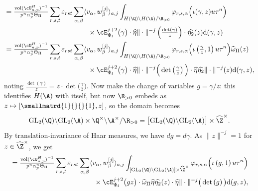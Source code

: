 \documentclass[10pt,reqno,a4paper]{amsart}
\newcommand{\Phif}{{\Phi\subf}}
\newcommand{\omegahat}{\widehat{\omega}}
\newcommand{\etahat}{\widehat{\eta}}
\newcommand{\subf}{_{\mathrm{f}}}
\newcommand{\GL}{\mathrm{GL}}
\begin{document}
\begin{align*}
&= \tfrac{\operatorname{vol}(\cU_{n,p}^H)^{-1}}{{p^{n}\alpha_{p}^n} \Theta_\Pi} \sum_{r,s,t} \varepsilon_{rst} \sum_{\alpha,\beta} \langle v_\alpha, w_\beta^{[j]}\rangle_{a,j}
\int_{H(\Q)\backslash H(\A)/\R_{>0}}  \varphi_{r,s,\alpha}\Big(\iota(\gamma,z)u\tau^{n}\Big)   \\
&\hspace{120pt}\times \cE_{\Phif}^{j+2} \big(\gamma \big) \cdot \etahat\|\cdot\|^{-j}\left(\tfrac{\det(\gamma)}{z}\right)\cdot \widehat{\eta_2}(z)  \mathrm{d}(\gamma,z)\\
&= \tfrac{\operatorname{vol}(\cU_{n,p}^H)^{-1}}{p^{n}\alpha_{p}^n \Theta_\Pi} \sum_{r,s,t} \varepsilon_{rst} \sum_{\alpha,\beta} \langle v_\alpha, w_\beta^{[j]}\rangle_{a,j}
\int_{H(\Q)\backslash H(\A)/\R_{>0}}  \varphi_{r,s,\alpha} \Big(\iota\left(\tfrac{\gamma}{z},1\right)u\tau^{n}\Big)\omegahat_\Pi(z)   \\
&\hspace{120pt}\times \cE_{\Phif}^{j+2} \big(\gamma \big) \cdot \etahat\|\cdot\|^{-j}\Big(\det\left(\tfrac{\gamma}{z}\right) \Big) \cdot \etahat\widehat{\eta_2}\|\cdot\|^{-j}(z)  \mathrm{d}(\gamma,z),
\end{align*}
noting $\tfrac{\det(\gamma)}{z} = z\cdot \det\big(\tfrac{\gamma}{z}\big)$. Now make the change of variables $g = \gamma/z$: this identifies $H(\A)$ with itself, but now $\R_{>0}$ embeds as $z \mapsto [\smallmatrd{1}{}{}{1}, z]$, so the domain becomes
\[
\GL_2(\Q)\backslash \GL_2(\A) \times \Q^\times\backslash\A^\times/\R_{>0} = \big[\GL_2(\Q)\backslash \GL_2(\A)\big] \times \widehat{\Z}^{\times}.
\]
By translation-invariance of Haar measures, we have $dg = d\gamma$. As $\|z\|^{-j} = 1$ for $z \in \widehat{\Z}^\times$, we get
\begin{align}
&= \tfrac{\operatorname{vol}(\cU_{n,p}^H)^{-1}}{p^{n}\alpha_{p}^n \Theta_\Pi} \sum_{r,s,t} \varepsilon_{rst} \sum_{\alpha,\beta} \langle v_\alpha, w_\beta^{[j]}\rangle_{a,j}
\int_{[\GL_2(\Q)\backslash \GL_2(\A)] \times \widehat{\Z}^{\times}}  \varphi_{r,s,\alpha} \Big(\iota\left(g,1\right)u\tau^{n}\Big)  \notag  \\
&\hspace{120pt}\times \cE_{\Phif}^{j+2} \big(g z\big)  \cdot \omegahat_\Pi\etahat\widehat{\eta_2}(z)  \cdot \etahat\|\cdot\|^{-j}\big(\det\left(g\right) \big) \mathrm{d}(g,z),\label{eq:measure 3}
\end{align}
\end{document}
